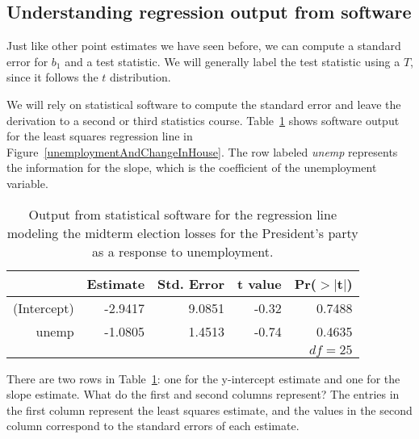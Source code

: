 \subsection{Understanding regression output from software}
\label{testStatisticForTheSlope}

Just like other point estimates we have seen before, we can compute a standard error for $b_1$ and a test statistic. We will generally label the test statistic using a $T$, since it follows the $t$ distribution.

We will rely on statistical software to compute the standard error and leave the derivation to a second or third statistics course. Table~\ref{midtermElectionUnemploymentRRegressionOutput} shows software output for the least squares regression line in Figure~\ref{unemploymentAndChangeInHouse}. The row labeled \emph{unemp} represents the information for the slope, which is the coefficient of the unemployment variable.
\begin{table}[ht]
\centering
\begin{tabular}{rrrrr}
  \hline
 & Estimate & Std. Error & t value & Pr($>$$|$t$|$) \\ 
  \hline
(Intercept) & -2.9417 & 9.0851 & -0.32 & 0.7488 \\ 
  unemp & -1.0805 & 1.4513 & -0.74 & 0.4635 \\ 
   \hline
   \multicolumn{5}{r}{$df=25$} \\
\end{tabular}
\caption{Output from statistical software for the regression line modeling the midterm election losses for the President's party as a response to unemployment.}
\label{midtermElectionUnemploymentRRegressionOutput}
\end{table}

\begin{example}{There are two rows in Table~\ref{midtermElectionUnemploymentRRegressionOutput}: one for the y-intercept estimate and one for the slope estimate. What do the first and second columns represent?}
The entries in the first column represent the least squares estimate, and the values in the second column correspond to the standard errors of each estimate.
\end{example}

